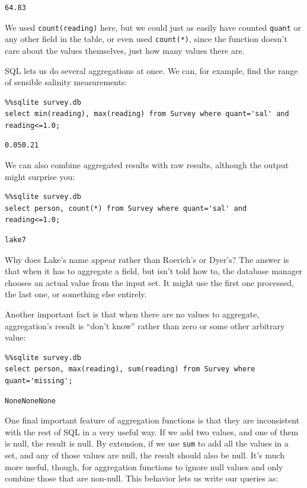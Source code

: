 \documentclass[]{book}
\begin{document}
\begin{verbatim}
64.83
\end{verbatim}

We used \texttt{count(reading)} here, but we could just as easily have
counted \texttt{quant} or any other field in the table, or even used
\texttt{count(*)}, since the function doesn't care about the values
themselves, just how many values there are.

SQL lets us do several aggregations at once. We can, for example, find
the range of sensible salinity measurements:

\begin{verbatim}
%%sqlite survey.db
select min(reading), max(reading) from Survey where quant='sal' and reading<=1.0;
\end{verbatim}

\begin{verbatim}
0.050.21
\end{verbatim}

We can also combine aggregated results with raw results, although the
output might surprise you:

\begin{verbatim}
%%sqlite survey.db
select person, count(*) from Survey where quant='sal' and reading<=1.0;
\end{verbatim}

\begin{verbatim}
lake7
\end{verbatim}

Why does Lake's name appear rather than Roerich's or Dyer's? The answer
is that when it has to aggregate a field, but isn't told how to, the
database manager chooses an actual value from the input set. It might
use the first one processed, the last one, or something else entirely.

Another important fact is that when there are no values to aggregate,
aggregation's result is ``don't know'' rather than zero or some other
arbitrary value:

\begin{verbatim}
%%sqlite survey.db
select person, max(reading), sum(reading) from Survey where quant='missing';
\end{verbatim}

\begin{verbatim}
NoneNoneNone
\end{verbatim}

One final important feature of aggregation functions is that they are
inconsistent with the rest of SQL in a very useful way. If we add two
values, and one of them is null, the result is null. By extension, if we
use \texttt{sum} to add all the values in a set, and any of those values
are null, the result should also be null. It's much more useful, though,
for aggregation functions to ignore null values and only combine those
that are non-null. This behavior lets us write our queries as:
\end{document}
